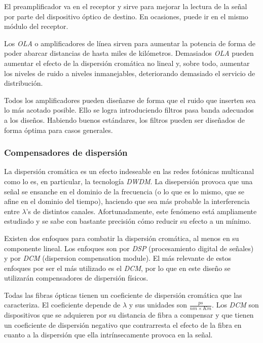 El preamplificador va en el receptor y sirve para mejorar la lectura
de la señal por parte del dispositivo óptico de destino. En ocasiones,
puede ir en el mismo módulo del receptor.

Los \emph{OLA} o amplificadores de línea sirven para aumentar la
potencia de forma de poder abarcar distancias de hasta miles de
kilómetros. Demasiados \emph{OLA} pueden aumentar el efecto de la
dispersión cromática no lineal y, sobre todo, aumentar los niveles de
ruido a niveles inmanejables, deteriorando demasiado el servicio de
distribución.

Todos los amplificadores pueden diseñarse de forma que el ruido que
inserten sea lo más acotado posible. Ello se logra introduciendo
filtros pasa banda adecuados a los diseños. Habiendo buenos
estándares, los filtros pueden ser diseñados de forma óptima para
casos generales.

\subsubsection{Compensadores de dispersión}
\label{sec:dispersion}

La dispersión cromática es un efecto indeseable en las redes fotónicas
multicanal como lo es, en particular, la tecnología \emph{DWDM}. La
disepersión provoca que una señal se ensanche en el dominio de la
frecuencia (o lo que es lo mismo, que se afine en el dominio del
tiempo), haciendo que sea más probable la interferencia entre
$\lambda$'s de distintos canales. Afortunadamente, este fenómeno está
ampliamente estudiado y se sabe con bastante precisión cómo reducir su
efecto a un mínimo.

Existen dos enfoques para combatir la dispersión cromática, al menos
en su componente lineal. Los enfoques son por \emph{DSP}
(procesamiento digital de señales) y por \emph{DCM} (dispersion
compensation module). El más relevante de estos enfoques por ser el
más utilizado es el \emph{DCM}, por lo que en este diseño se
utilizarán compensadores de dispersión físicos.

Todas las fibras ópticas tienen un coeficiente de dispersión cromática
que las caracteriza. El coeficiente depende de $\lambda$ y sus
unidades son $\frac{ps}{nm \times Km}$. Los \emph{DCM} son dispositivos
que se adquieren por su distancia de fibra a compensar y que tienen un
coeficiente de dispersión negativo que contrarresta el efecto de la
fibra en cuanto a la dispersión que ella intrínsecamente provoca en la
señal.

